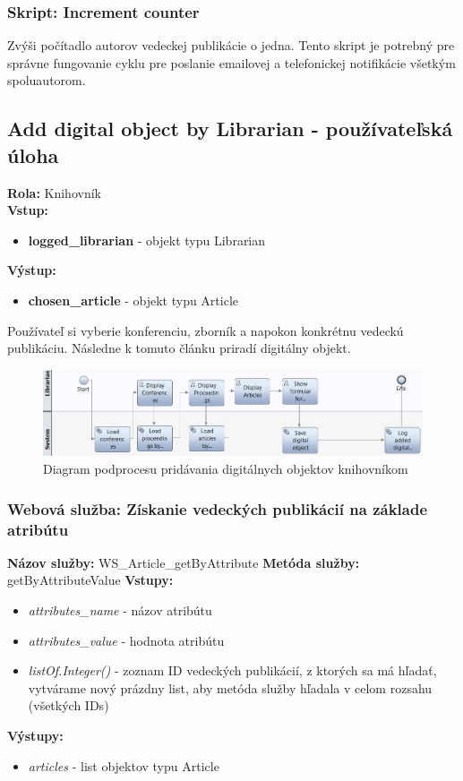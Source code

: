 \documentclass[10pt,oneside,slovak,a4paper]{article}
\begin{document}
\subsubsection{Skript: Increment counter}
Zvýši počítadlo autorov vedeckej publikácie o jedna. Tento skript je potrebný pre správne fungovanie cyklu pre poslanie emailovej a telefonickej notifikácie všetkým spoluautorom.

\subsection{Add digital object by Librarian - používateľská úloha}
\textbf{Rola:} Knihovník\\
\textbf{Vstup:}

\begin{itemize}
\item \textbf{logged\_librarian} - objekt typu Librarian
\end{itemize}

\textbf{Výstup:}

\begin{itemize}
\item \textbf{chosen\_article} - objekt typu Article
\end{itemize}

Používateľ si vyberie konferenciu, zborník a napokon konkrétnu vedeckú publikáciu. Následne k tomuto článku priradí digitálny objekt.

\begin{figure} [H]
\centering
\includegraphics[scale=0.4]{diagrams/diagAddDigitalLib.jpg} 
\caption{Diagram podprocesu pridávania digitálnych objektov knihovníkom}
\end{figure}

\subsubsection{Webová služba: Získanie vedeckých publikácií na základe atribútu}
\textbf{Názov služby:} WS\_Article\_getByAttribute
\textbf{Metóda služby:} getByAttributeValue
\textbf{Vstupy:}
	\begin{itemize}
		\item \textit{attributes\_name} - názov atribútu
		\item \textit{attributes\_value} - hodnota atribútu
		\item \textit{listOf.Integer()} - zoznam ID vedeckých publikácií, z ktorých sa má hľadať, vytvárame nový prázdny list, aby metóda služby hľadala v celom rozsahu (všetkých IDs)
	\end{itemize}
\textbf{Výstupy:}
	\begin{itemize}
		\item \textit{articles} - list objektov typu Article
	\end{itemize}
\end{document}
